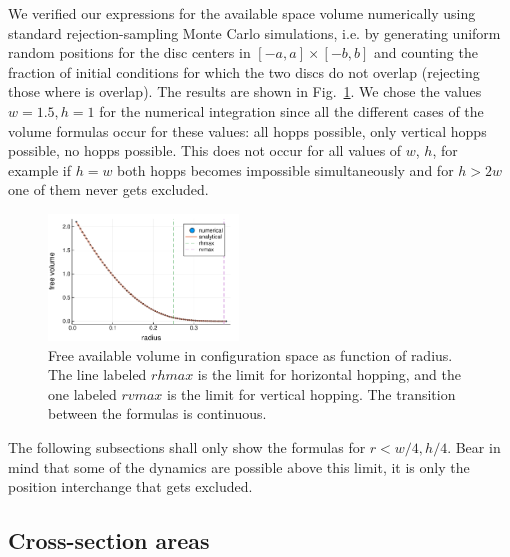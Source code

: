 \documentclass[superscriptaddress,pre,reprint,showpacs,twocolumn]{revtex4-1}
\begin{document}
We verified our expressions for the available space volume numerically using 
standard rejection-sampling Monte Carlo simulations, i.e. 
by generating uniform random positions for the disc centers in 
$[-a,a] \times [-b,b]$ and 
counting the fraction of initial conditions for 
which the two discs do not overlap (rejecting those where is overlap).
The results are shown in Fig.~\ref{VolMonteC}.
We chose the values $w=1.5, h=1$ for the numerical integration since all the different
cases of the volume formulas occur for these values: all hopps possible, only vertical
hopps possible, no hopps possible. This does not occur for all values of $w$, $h$,
for example if $h=w$ both hopps becomes impossible simultaneously and for $h>2w$
one of them never gets excluded.

\begin{figure}[h]
\centering
\includegraphics[width=0.45\textwidth]{./figures/FreeVolume01.pdf}
\caption{Free available volume in configuration space as function of radius. The
  line labeled $rhmax$ is the limit for horizontal hopping, and the one labeled
  $rvmax$ is the limit for vertical hopping. The transition between the formulas
is continuous.}
\label{VolMonteC}%
\end{figure}


The following subsections shall only show the formulas for $r<w/4, h/4$.
Bear in mind that some of the dynamics are possible above this limit,
it is only the position interchange that gets excluded. \\



\subsection{Cross-section areas}\label{areahop}
\end{document}
